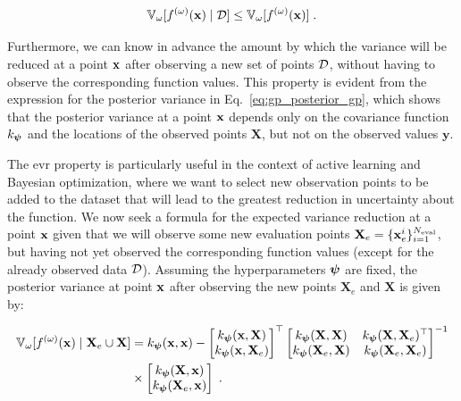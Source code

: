 \begin{equation}
  \mathbb{V}_{\omega}[f^{(\omega)}(\mathbf{x}) \mid \mathcal{D}] \leq \mathbb{V}_{\omega}[f^{(\omega)}(\mathbf{x})]\;.
\end{equation}

Furthermore, we can know in advance the amount by which the variance will be reduced at a point $\mathbf{x}$ after observing a new set of points $\mathcal{D}$, without having to observe the corresponding function values. This property is evident from the expression for the posterior variance in Eq.~\eqref{eq:gp_posterior_gp}, which shows that the posterior variance at a point $\mathbf{x}$ depends only on the covariance function $k_{\boldsymbol{\psi}}$ and the locations of the observed points $\mathbf{X}$, but not on the observed values $\mathbf{y}$.

\smallskip
The \gls{evr} property is particularly useful in the context of active learning and Bayesian optimization, where we want to select new observation points to be added to the dataset that will lead to the greatest reduction in uncertainty about the function. We now seek a formula for the expected variance reduction at a point $\mathbf{x}$ given that we will observe some new evaluation points $\mathbf{X}_e = \{\mathbf{x}_e^i\}_{i=1}^{N_{\mathrm{eval}}}$, but having not yet observed the corresponding function values (except for the already observed data $\mathcal{D}$). Assuming the hyperparameters $\boldsymbol{\psi}$ are fixed, the posterior variance at point $\mathbf{x}$ after observing the new points $\mathbf{X}_e$ and $\mathbf{X}$ is given by:

\begin{equation}
\begin{split}
  \mathbb{V}_{\omega}[f^{(\omega)}(\mathbf{x}) \mid \mathbf{X}_e \cup \mathbf{X}] & = k_{\boldsymbol{\psi}}(\mathbf{x}, \mathbf{x}) - \begin{bmatrix}
    k_{\boldsymbol{\psi}}(\mathbf{x}, \mathbf{X}) \\
    k_{\boldsymbol{\psi}}(\mathbf{x}, \mathbf{X}_e)
  \end{bmatrix}^{\top} \begin{bmatrix}
    k_{\boldsymbol{\psi}}(\mathbf{X}, \mathbf{X}) & k_{\boldsymbol{\psi}}(\mathbf{X}, \mathbf{X}_e)^{\top} \\
    k_{\boldsymbol{\psi}}(\mathbf{X}_e, \mathbf{X}) & k_{\boldsymbol{\psi}}(\mathbf{X}_e, \mathbf{X}_e)
  \end{bmatrix}^{-1} \\
  & \times \begin{bmatrix}
    k_{\boldsymbol{\psi}}(\mathbf{X}, \mathbf{x}) \\
    k_{\boldsymbol{\psi}}(\mathbf{X}_e, \mathbf{x})
  \end{bmatrix}\;.
\end{split}
\end{equation}

